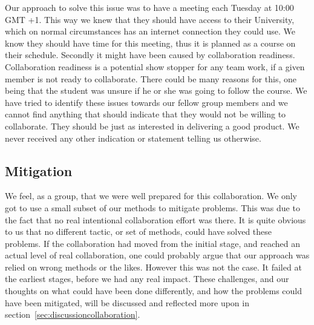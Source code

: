 Our approach to solve this issue was to have a meeting each Tuesday at 10:00 GMT +1. This way we knew that they should have access to their University, which on normal circumstances has an internet connection they could use. We know they should have time for this meeting, thus it is planned as a course on their schedule. Secondly it might have been caused by collaboration readiness. Collaboration readiness is a potential show stopper for any team work, if a given member is not ready to collaborate. There could be many reasons for this, one being that the student was unsure if he or she was going to follow the course. We have tried to identify these issues towards our fellow group members and we cannot find anything that should indicate that they would not be willing to collaborate. They should be just as interested in delivering a good product. We never received any other indication or statement telling us otherwise.

\subsection{Mitigation} \label{sec:mitigation}
We feel, as a group, that we were well prepared for this collaboration. We only got to use a small subset of our methods to mitigate problems. This was due to the fact that no real intentional collaboration effort was there. It is quite obvious to us that no different tactic, or set of methods, could have solved these problems. If the collaboration had moved from the initial stage, and reached an actual level of real collaboration, one could probably argue that our approach was relied on wrong methods or the likes. However this was not the case. It failed at the earliest stages, before we had any real impact. These challenges, and our thoughts on what could have been done differently, and how the problems could have been mitigated, will be discussed and reflected more upon in section~\ref{sec:discussioncollaboration}.